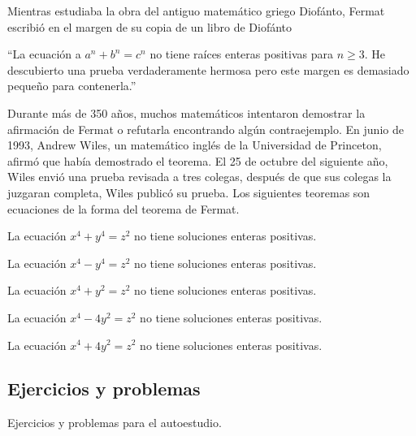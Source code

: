 Mientras estudiaba la obra del antiguo matemático griego Diofánto,
Fermat escribió en el margen de su copia de un libro de Diofánto
\begin{center}
    ``La ecuación a $a^n + b^n = c^n$ no tiene raíces enteras positivas para $n \geq 3$.
    He descubierto una prueba verdaderamente hermosa pero este margen es demasiado pequeño para contenerla.''
\end{center}
Durante más de 350 años, muchos matemáticos intentaron demostrar la afirmación de Fermat o refutarla encontrando algún contraejemplo.
En junio de 1993, Andrew Wiles, un matemático inglés de la Universidad de Princeton, afirmó que había demostrado el teorema.
El 25 de octubre del siguiente año, Wiles envió una prueba revisada a tres colegas, después de que sus colegas la juzgaran completa, Wiles publicó su prueba.
Los siguientes teoremas son ecuaciones de la forma del teorema de Fermat.

\begin{theorem.box}{}{}
    La ecuación $x^4 + y^4 = z^2$ no tiene soluciones enteras positivas.
\end{theorem.box}

\begin{theorem.box}{}{}
    La ecuación $x^4 - y^4 = z^2$ no tiene soluciones enteras positivas.
\end{theorem.box}

\begin{theorem.box}{}{}
    La ecuación $x^4 + y^2 = z^2$ no tiene soluciones enteras positivas.
\end{theorem.box}

\begin{theorem.box}{}{}
    La ecuación $x^4 - 4y^2 = z^2$ no tiene soluciones enteras positivas.
\end{theorem.box}

\begin{theorem.box}{}{}
    La ecuación $x^4 + 4y^2 = z^2$ no tiene soluciones enteras positivas.
\end{theorem.box}



\subsection{Ejercicios y problemas}
Ejercicios y problemas para el autoestudio.

